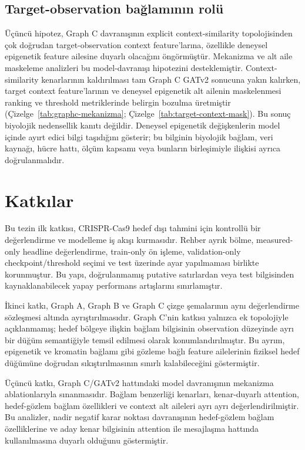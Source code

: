\subsection{Target-observation bağlamının rolü}

Üçüncü hipotez, Graph C davranışının explicit context-similarity topolojisinden çok doğrudan target-observation context feature'larına, özellikle deneysel epigenetik feature ailesine duyarlı olacağını öngörmüştür. Mekanizma ve alt aile maskeleme analizleri bu model-davranışı hipotezini desteklemiştir. Context-similarity kenarlarının kaldırılması tam Graph C GATv2 sonucuna yakın kalırken, target context feature'larının ve deneysel epigenetik alt ailenin maskelenmesi ranking ve threshold metriklerinde belirgin bozulma üretmiştir (Çizelge~\ref{tab:graphc-mekanizma}; Çizelge~\ref{tab:target-context-mask}). Bu sonuç biyolojik nedensellik kanıtı değildir. Deneysel epigenetik değişkenlerin model içinde ayırt edici bilgi taşıdığını gösterir; bu bilginin biyolojik bağlam, veri kaynağı, hücre hattı, ölçüm kapsamı veya bunların birleşimiyle ilişkisi ayrıca doğrulanmalıdır.

\section{Katkılar}

Bu tezin ilk katkısı, CRISPR-Cas9 hedef dışı tahmini için kontrollü bir değerlendirme ve modelleme iş akışı kurmasıdır. Rehber ayrık bölme, measured-only headline değerlendirme, train-only ön işleme, validation-only checkpoint/threshold seçimi ve test üzerinde ayar yapılmaması birlikte korunmuştur. Bu yapı, doğrulanmamış putative satırlardan veya test bilgisinden kaynaklanabilecek yapay performans artışlarını sınırlamıştır.

İkinci katkı, Graph A, Graph B ve Graph C çizge şemalarının aynı değerlendirme sözleşmesi altında ayrıştırılmasıdır. Graph C'nin katkısı yalnızca ek topolojiyle açıklanmamış; hedef bölgeye ilişkin bağlam bilgisinin observation düzeyinde ayrı bir düğüm semantiğiyle temsil edilmesi olarak konumlandırılmıştır. Bu ayrım, epigenetik ve kromatin bağlamı gibi gözleme bağlı feature ailelerinin fiziksel hedef düğümüne doğrudan sıkıştırılmasının sınırlı kalabileceğini göstermiştir.

Üçüncü katkı, Graph C/GATv2 hattındaki model davranışının mekanizma ablationlarıyla sınanmasıdır. Bağlam benzerliği kenarları, kenar-duyarlı attention, hedef-gözlem bağlam özellikleri ve context alt aileleri ayrı ayrı değerlendirilmiştir. Bu analizler, nadir negatif karar noktası davranışının hedef-gözlem bağlam özelliklerine ve aday kenar bilgisinin attention ile mesajlaşma hattında kullanılmasına duyarlı olduğunu göstermiştir.

